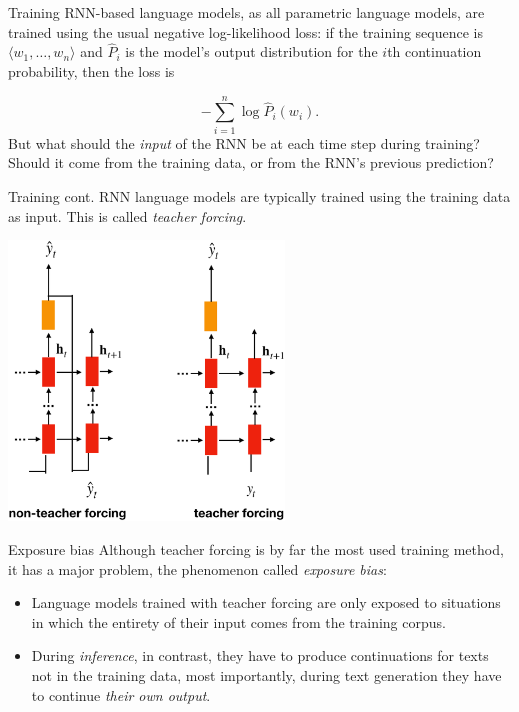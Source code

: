 \documentclass[style=upen, size=14pt]{powerdot}
\newcommand{\gold}{\color{arany}}
\theoremstyle{definition}
\begin{document}
\begin{slide}[toc=Training]{Training}
  RNN-based language models, as all parametric language models, are trained
  using the usual negative log-likelihood loss: if the training sequence is
  $\langle w_1,\dots, w_n \rangle$ and $\hat P_i$ is the model's output
  distribution for the $i$th continuation probability, then the loss is

  $$
  - \sum_{i=1}^n \log \hat P_i(w_i).
  $$
  But what should the \emph{input} of the RNN be at each time step during
  training? Should it come from the training data, or from the RNN's previous
  prediction?
\end{slide}

\begin{slide}[toc=]{Training cont.}
  RNN language models are typically trained using the training data as input.
  This is called \emph{\gold teacher forcing}.
  \begin{center}
    \includegraphics[width=0.55\textwidth]{figures/teacher_forcing.eps}
  \end{center}
\end{slide}

\begin{slide}[toc=Exposure bias]{Exposure bias}
  Although teacher forcing is by far the most used training method, it has a
  major problem, the phenomenon called \emph{\gold exposure bias}:\bigskip
  \begin{itemize}
  \item Language models trained with teacher forcing are only exposed to
    situations in which the entirety of their input comes from the training
    corpus.
  \item During \emph{inference}, in contrast, they have to produce continuations
    for texts not in the training data, most importantly, during text generation
    they have to continue \emph{their own output}.
  \end{itemize}
\end{slide}
\end{document}
